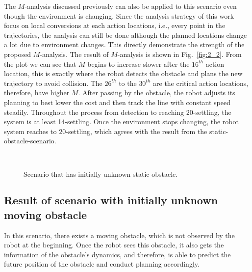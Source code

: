 \documentclass[letterpaper, 10 pt, conference]{ieeeconf}  %
\begin{document}
The $M$-analysis discussed previously can also be applied to this scenario even though the environment is changing. Since the analysis strategy of this work focus on local conversions at each action locations, i.e., every point in the trajectories, the analysis can still be done although the planned locations change a lot due to environment changes. This directly demonstrate the strength of the proposed $M$-analysis. The result of $M$-analysis is shown in Fig.~\ref{fig:2_2}. From the plot we can see that $M$ begins to increase slower after the $16^{th}$ action location, this is exactly where the robot detects the obstacle and plans the new trajectory to avoid collision. The $26^{th}$ to the $30^{th}$ are the critical action locations, therefore, have higher $M$. After passing by the obstacle, the robot adjusts its planning to best lower the cost and then track the line with constant speed steadily. Throughout the process from detection to reaching 20-settling, the system is at least 14-settling. Once the environment stops changing, the robot system reaches to 20-settling, which agrees with the result from the static-obstacle-scenario.     




\begin{figure}[t]
      \centering
      \\
      
      \caption{Scenario that has initially unknown static obstacle.}
      
\end{figure}





\subsection{Result of scenario with initially unknown moving obstacle}
In this scenario, there exists a moving obstacle, which is not observed by the robot at the beginning. Once the robot sees this obstacle, it also gets the information of the obstacle's dynamics, and therefore, is able to predict the future position of the obstacle and conduct planning accordingly. 
\end{document}
